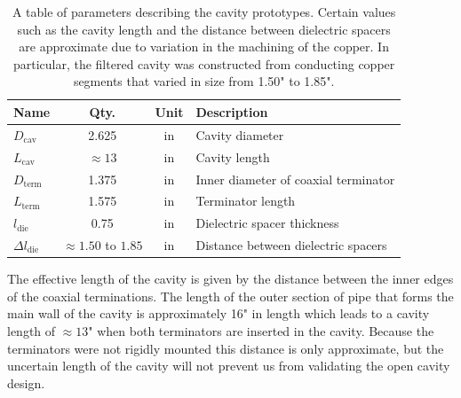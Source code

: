 \begin{table}[htbp]
    \centering
    \caption{\label{tab:chap6-cavity-prototype-params} A table of parameters describing the cavity prototypes. Certain values such as the cavity length and the distance between dielectric spacers are approximate due to variation in the machining of the copper. In particular, the filtered cavity was constructed from conducting copper segments that varied in size from 1.50" to 1.85".}
    \begin{tabular}{l|c|c|l}
        \hline
        Name & Qty. & Unit & Description \\
        \hline
        $D_\mathrm{cav}$ & 2.625 & in & Cavity diameter\\
        $L_\mathrm{cav}$ & $\approx 13$ & in & Cavity length\\
        $D_\mathrm{term}$ & 1.375 & in & Inner diameter of coaxial terminator\\
        $L_\mathrm{term}$ & 1.575 & in & Terminator length\\
        \hline
        $l_\mathrm{die}$ & 0.75 & in & Dielectric spacer thickness\\
        $\Delta l_\mathrm{die}$ & $\approx 1.50$ to $1.85$ & in & Distance between dielectric spacers\\
        \hline
    \end{tabular}
\end{table}

The effective length of the cavity is given by the distance between the inner edges of the coaxial terminations. The length of the outer section of pipe that forms the main wall of the cavity is approximately 16" in length which leads to a cavity length of $\approx 13$" when both terminators are inserted in the cavity. Because the terminators were not rigidly mounted this distance is only approximate, but the uncertain length of the cavity will not prevent us from validating the open cavity design.


